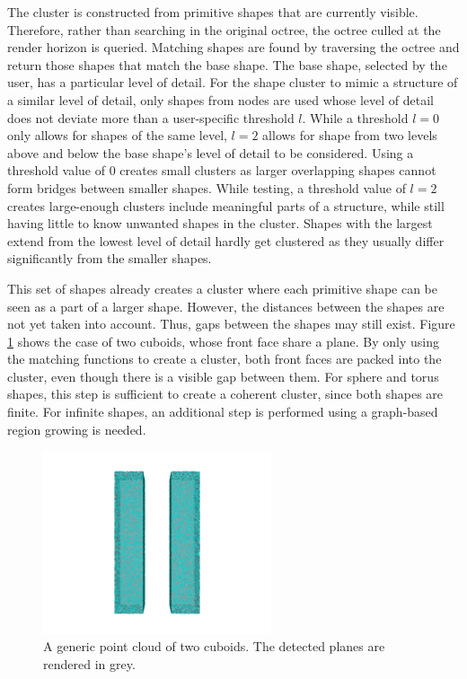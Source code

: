 The cluster is constructed from primitive shapes that are currently visible. Therefore, rather than searching in the original octree, the octree culled at the render horizon is queried. Matching shapes are found by traversing the octree and return those shapes that match the base shape. The base shape, selected by the user, has a particular level of detail. For the shape cluster to mimic a structure of a similar level of detail, only shapes from nodes are used whose level of detail does not deviate more than a user-specific threshold $l$. While a threshold $l = 0$ only allows for shapes of the same level, $l = 2$ allows for shape from two levels above and below the base shape's level of detail to be considered. Using a threshold value of 0 creates small clusters as larger overlapping shapes cannot form bridges between smaller shapes. While testing, a threshold value of $l = 2$ creates large-enough clusters include meaningful parts of a structure, while still having little to know unwanted shapes in the cluster. Shapes with the largest extend from the lowest level of detail hardly get clustered as they usually differ significantly from the smaller shapes. 

\par

This set of shapes already creates a cluster where each primitive shape can be seen as a part of a larger shape. However, the distances between the shapes are not yet taken into account. Thus, gaps between the shapes may still exist. Figure \ref{fig:cuboids} shows the case of two cuboids, whose front face share a plane. By only using the matching functions to create a cluster, both front faces are packed into the cluster, even though there is a visible gap between them.
For sphere and torus shapes, this step is sufficient to create a coherent cluster, since both shapes are finite. For infinite shapes, an additional step is performed using a graph-based region growing is needed. 

\begin{figure}
    \centering
    \includegraphics[width=0.6\textwidth]{Shape_Detection/cuboids.png}
    \caption[Point cloud consisting of two cuboids.]
        {A generic point cloud of two cuboids. The detected planes are rendered in grey.}
    \label{fig:cuboids}
\end{figure}


